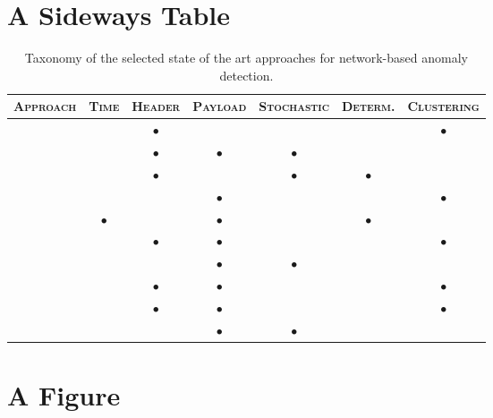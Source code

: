 
\section{A Sideways Table}

\clearpage
\begin{table}
\renewcommand{\arraystretch}{1.5} \centering
\begin{tabular}{rcccccc}
\toprule \textsc{Approach} & \textsc{Time} & \textsc{Header} &
\textsc{Payload} & \textsc{Stochastic} & \textsc{Determ.} & \textsc{Clustering}\\
\midrule \cite{phad} & & $\bullet$ & & & & $\bullet$ \\
\cite{kruegel:sac2002:anomaly} & & $\bullet$ & $\bullet$ & $\bullet$ & & \\
\cite{protocolanom} & & $\bullet$ & & $\bullet$ & $\bullet$ & \\
\cite{ramadas} & & & $\bullet$ & & & $\bullet$ \\
\cite{rules-payl} & $\bullet$ & & $\bullet$ & & $\bullet$ & \\
\cite{zanero-savaresi} & & $\bullet$ & $\bullet$ & & & $\bullet$ \\
\cite{wang:raid2004:payl} & & & $\bullet$ & $\bullet$ & & \\
\cite{zanero-pattern} & & $\bullet$ & $\bullet$ & & & $\bullet$ \\
\cite{DBLP:conf/iwia/BolzoniEHZ06} & & $\bullet$ & $\bullet$ & & & $\bullet$ \\
\cite{wang:raid2006:anagram} & & & $\bullet$ & $\bullet$ & & \\
\bottomrule
\end{tabular}
\caption{Taxonomy of the selected state of the art approaches for network-based anomaly detection.}
\label{tab:network-sota-taxonomy}
\end{table}
\clearpage


\section{A Figure}

